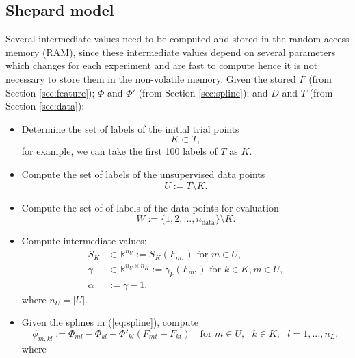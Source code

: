 \documentclass[12pt]{article}
\begin{document}
\subsection{Shepard model}
Several intermediate values need to be computed and stored in the random access memory (RAM), since these intermediate values depend on several parameters which changes for each experiment and are fast to compute hence it is not necessary to store them in the non-volatile memory. Given the stored $F$ (from Section \ref{sec:feature}); $\Phi$ and $\Phi'$ (from Section \ref{sec:spline}); and $D$ and $T$ (from Section \ref{sec:data}):
\begin{itemize}
	\item Determine the set of labels of the initial trial points
	\begin{equation}
		K \subset T,
	\end{equation}
	for example, we can take the first 100 labels of $T$ as $K$.
	\item Compute the set of labels of the unsupervised data points
	\begin{equation}
		U := T \setminus K.
	\end{equation}
	\item Compute the set of of labels of the data points for evaluation
	\begin{equation}
		W := \{1,2,...,n_\text{data}\} \setminus K.
	\end{equation}
	\item Compute intermediate values:
	\begin{equation}
		\label{eq:intermediate}
		\begin{split}
			S_K &\in \mathbb{R}^{n_U} := S_K(F_{m:}) \text{ for } m \in U,\\
			\gamma &\in \mathbb{R}^{n_U \times n_K} := \gamma_k(F_{m:}) \text{ for } k \in K, m \in U, \\
			\alpha &:= \gamma - 1.
		\end{split}
	\end{equation}
	where $n_U = |U|.$
	\item Given the splines in (\ref{eq:spline}), compute
	\begin{equation} %
		\phi_{m, kl} := \Phi_{ml} - \Phi_{kl} - \Phi'_{kl}(F_{mt}-F_{kt}) \quad \text{for } m \in U, \text{ }k \in K, \text{ }l = 1,...,n_L,
	\end{equation}
	where
	\begin{equation}
		\begin{split}

\end{split}
\end{equation}
\end{itemize}
\end{document}
